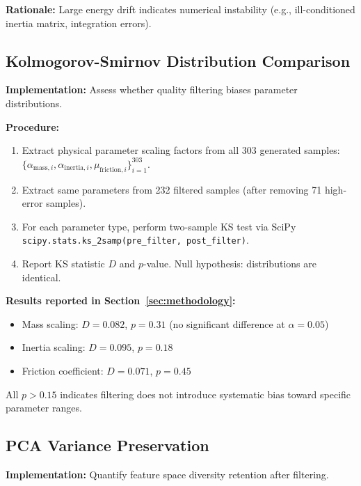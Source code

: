 \documentclass[DTMColor]{ROB-New}
\begin{document}
\textbf{Rationale:} Large energy drift indicates numerical instability (e.g., ill-conditioned inertia matrix, integration errors).

\subsection{Kolmogorov-Smirnov Distribution Comparison}

\textbf{Implementation:} Assess whether quality filtering biases parameter distributions.

\textbf{Procedure:}
\begin{enumerate}[leftmargin=*, itemsep=1pt]
    \item Extract physical parameter scaling factors from all 303 generated samples: $\{\alpha_{\text{mass},i}, \alpha_{\text{inertia},i}, \mu_{\text{friction},i}\}_{i=1}^{303}$.
    \item Extract same parameters from 232 filtered samples (after removing 71 high-error samples).
    \item For each parameter type, perform two-sample KS test via SciPy \texttt{scipy.stats.ks\_2samp(pre\_filter, post\_filter)}.
    \item Report KS statistic $D$ and $p$-value. Null hypothesis: distributions are identical.
\end{enumerate}

\textbf{Results reported in Section~\ref{sec:methodology}:}
\begin{itemize}[leftmargin=*, itemsep=1pt]
    \item Mass scaling: $D=0.082$, $p=0.31$ (no significant difference at $\alpha=0.05$)
    \item Inertia scaling: $D=0.095$, $p=0.18$
    \item Friction coefficient: $D=0.071$, $p=0.45$
\end{itemize}
All $p > 0.15$ indicates filtering does not introduce systematic bias toward specific parameter ranges.

\subsection{PCA Variance Preservation}

\textbf{Implementation:} Quantify feature space diversity retention after filtering.
\end{document}
